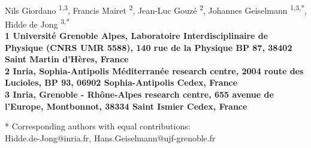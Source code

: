 \\
Nils Giordano \textsuperscript{1,3},
Francis Mairet \textsuperscript{2},
Jean-Luc Gouzé \textsuperscript{2},
Johannes Geiselmann \textsuperscript{1,3,*},
Hidde de Jong \textsuperscript{3,*}
\\
\bigskip
\bf{1} Université Grenoble Alpes, Laboratoire Interdisciplinaire de Physique (CNRS UMR 5588), 140 rue de la Physique BP 87, 38402 Saint Martin d'Hères, France
\\
\bf{2} Inria, Sophia-Antipolis Méditerranée research centre, 2004 route des Lucioles, BP 93, 06902 Sophia-Antipolis Cedex, France
\\
\bf{3} Inria, Grenoble - Rhône-Alpes research centre, 655 avenue de l'Europe, Montbonnot, 38334 Saint Ismier Cedex, France
\\
\bigskip

* Corresponding authors with equal contributions:\\
Hidde.de-Jong@inria.fr, Hans.Geiselmann@ujf-grenoble.fr